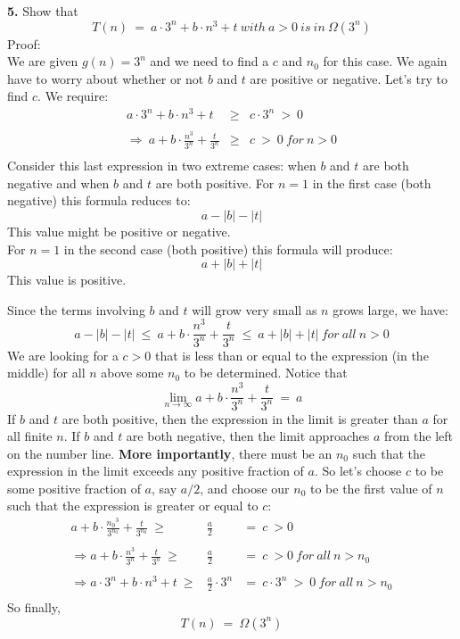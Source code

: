 
\vspace*{2em}


{\bf{5.}} Show that
\[
T(n) \ = \ a{\cdot}3^n + b{\cdot}n^3 + t
\ {\mathit{with}} \ a > 0 \ {\mathit{is\ in}} \ \Omega(3^n)
\]
%
Proof: \\
We are given $g(n) = 3^n$ and we need to find a $c$ and $n_0$ for this case.
We again have to worry about whether or not $b$ and $t$ are positive
or negative. Let's try to find $c$. We require:
\begin{eqnarray*}
a{\cdot}3^n + b{\cdot}n^3 + t & \ge & c{\cdot}3^n \ > \ 0 \\
& & \\
\Rightarrow \ a + b{\cdot}\frac{n^3}{3^n} + \frac{t}{3^n} & \ge & c \ > \ 0 \ {\mathit{for}} \ n > 0 \\
\end{eqnarray*}
Consider this last expression in two extreme cases:
when $b$ and $t$ are both negative and when $b$ and $t$ are both positive.
For $n=1$ in the first case (both negative) this formula reduces to:
\[
a - |b| - |t|
\]
This value might be positive or negative. \\
For $n=1$ in the second case (both positive) this formula will produce:
\[
a + |b| + |t|
\]
This value is positive.

Since the terms involving $b$ and $t$ will grow very small as $n$ grows
large, we have:
\[
a - |b| - |t| \ \le \ a + b{\cdot}\frac{n^3}{3^n} + \frac{t}{3^n} \ \le \ a + |b| + |t| \ {\mathit{for\ all}} \ n > 0
\]
We are looking for a $c > 0$ that is less than or equal to the expression
(in the middle) for all $n$ above some $n_0$ to be determined.
Notice that
\[
\lim_{n{\rightarrow}\infty}{a + b{\cdot}\frac{n^3}{3^n} + \frac{t}{3^n}} \ = \ a
\]
If $b$ and $t$ are both positive, then the expression in the limit is
greater than $a$ for all finite $n$. If $b$ and $t$ are both negative,
then the limit approaches $a$ from the left on the number line.
{\bf{More importantly}}, there must be an $n_0$ such that the expression
in the limit exceeds any positive fraction of $a$. So let's choose
$c$ to be some positive fraction of $a$, say $a/2$, and choose our $n_0$ to
be the first value of $n$ such that the expression is greater or equal to $c$:
\begin{eqnarray*}
{a + b{\cdot}\frac{{n_0}^3}{3^{n_0}} + \frac{t}{3^{n_0}}} \ \ge & \frac{a}{2} & = \ c \ > 0 \\
& & \\
\Rightarrow {a + b{\cdot}\frac{n^3}{3^n} + \frac{t}{3^n}} \ \ge & \frac{a}{2} & = \ c \ > 0 \ {\mathit{for\ all}} \ n > n_0 \\
& & \\
\Rightarrow a{\cdot}3^n + b{\cdot}n^3 + t \ \ge & \frac{a}{2}{\cdot}3^n & = \ c{\cdot}3^n \ > \ 0 \ {\mathit{for\ all}} \ n > n_0 \\
\end{eqnarray*}
So finally,
\[
T(n) \ = \ \Omega(3^n)
\]


